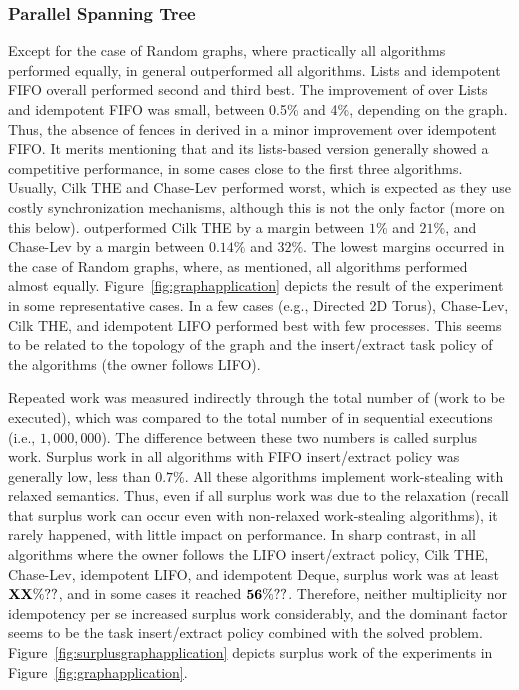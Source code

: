 




\subsubsection{Parallel Spanning Tree}


Except for the case of Random graphs, where practically all algorithms performed equally, in general \NCWSM{} outperformed all algorithms.  \NCWSM Lists and idempotent FIFO overall performed second and third best.  The improvement of \NCWSM{} over \NCWSM Lists and idempotent FIFO was small, between 0.5\% and 4\%, depending on the graph.  Thus, the absence of fences in \NCWSM{} derived in a minor improvement over idempotent FIFO.  It merits mentioning that \BNCWSM and its lists-based version generally showed a competitive performance, in some cases close to the first three algorithms.  Usually, Cilk THE and Chase-Lev performed worst, which is expected as they use costly synchronization mechanisms, although this is not the only factor (more on this below).  \NCWSM outperformed Cilk THE by a margin between $1\%$ and $21\%$, and Chase-Lev by a margin between $0.14\%$ and $32\%$.  The lowest margins occurred in the case of Random graphs, where, as mentioned, all algorithms performed almost equally.  Figure~\ref{fig:graphapplication} depicts the result of the experiment in some representative cases.  In a few cases (e.g., Directed 2D Torus), Chase-Lev, Cilk THE, and idempotent LIFO performed best with few processes. This seems to be related to the topology of the graph and the insert/extract task policy of the algorithms (the owner follows LIFO).

Repeated work was measured indirectly through the total number of \Puts (work to be executed), which was compared to the total number of \Puts in sequential executions (i.e., $1,000,000$).  The difference between these two numbers is called surplus work.  Surplus work in all algorithms with FIFO insert/extract policy was generally low, less than $0.7\%$.  All these algorithms implement work-stealing with relaxed semantics. Thus, even if all surplus work was due to the relaxation (recall that surplus work can occur even with non-relaxed work-stealing algorithms), it rarely happened, with little impact on performance.  In sharp contrast, in all algorithms where the owner follows the LIFO insert/extract policy, Cilk THE, Chase-Lev, idempotent LIFO, and idempotent Deque, surplus work was at least $\bf XX\%??$, and in some cases it reached $\bf 56\%??$.  Therefore, neither multiplicity nor idempotency per se increased surplus work considerably, and the dominant factor seems to be the task insert/extract policy combined with the solved problem.  Figure~\ref{fig:surplusgraphapplication} depicts surplus work of the experiments in Figure~\ref{fig:graphapplication}.

